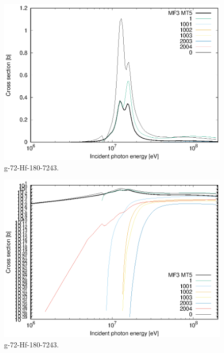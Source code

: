 \begin{figure}
 \includegraphics[width=\linewidth]{eps/g_72-Hf-180_7243.eps}
  \caption{g-72-Hf-180-7243.}
\end{figure}
\begin{figure}
 \includegraphics[width=\linewidth]{eps-log/g_72-Hf-180_7243.eps}
 \caption{g-72-Hf-180-7243.}
\end{figure}
\newpage \clearpage

